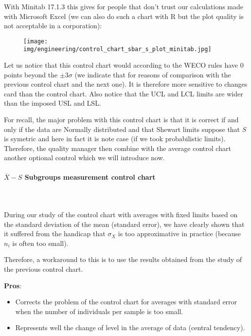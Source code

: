 	With Minitab 17.1.3 this gives for people that don't trust our calculations made with Microsoft Excel (we can also do such a chart with R but the plot quality is not acceptable in a corporation):
	\begin{figure}[H]
		\centering
		\texttt{[image: img/engineering/control\_chart\_sbar\_s\_plot\_minitab.jpg]}
	\end{figure}
	Let us notice that this control chart would according to the WECO rules have $0$ points beyond the $\pm 3\sigma$ (we indicate that for reasons of comparison with the previous control chart and the next one). It is therefore more sensitive to changes card than the control chart. Also notice that the UCL and LCL limits are wider than the imposed USL and LSL.
	
	For recall, the major problem with this control chart is that it is correct if and only if the data are Normally distributed and that Shewart limits suppose that $S$ is symetric and here in fact it is note case (if we took probabilistic limits). Therefore, the quality manager then combine with the average control chart another optional control which we will introduce now.
	
	\pagebreak
	\paragraph{$\overline{X}-S$ Subgroups measurement control chart}\mbox{}\\\\
	During our study of the control chart with averages with fixed limits based on the standard deviation of the mean (standard error), we have clearly shown that it suffered from the handicap that $\sigma_X$ is too approximative in practice (because $n_i$ is often too small).

	Therefore, a workaround to this is to use the results obtained from the study of the previous control chart.
	
	\textbf{Pros}:
	\begin{itemize}
		\item Corrects the problem of the control chart for averages with standard error when the number of individuals per sample is too small. 

		\item Represents well the change of level in the average of data (central tendency).
	\end{itemize}

